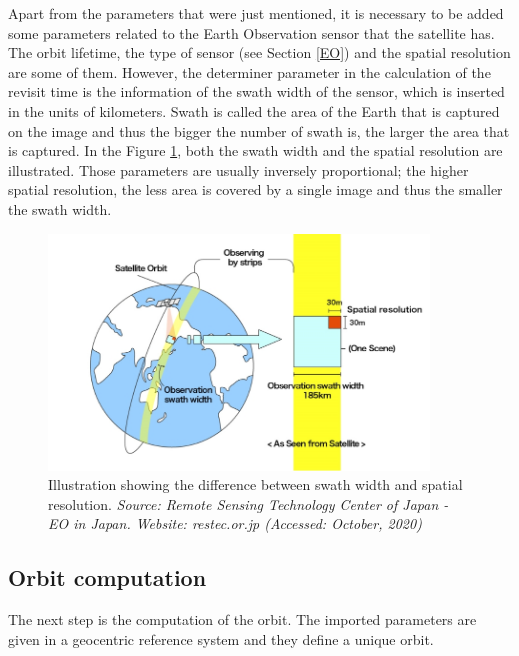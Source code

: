 Apart from the parameters that were just mentioned, it is necessary to be added some parameters related to the Earth Observation sensor that the satellite has. The orbit lifetime, the type of sensor (see Section \ref{EO}) and the spatial resolution are some of them. However, the determiner parameter in the calculation of the revisit time is the information of the swath width of the sensor, which is inserted in the units of kilometers. Swath is called the area of the Earth that is captured on the image and thus the bigger the number of swath is, the larger the area that is captured. In the Figure \ref{swath_width}, both the swath width and the spatial resolution are illustrated. Those parameters are usually inversely proportional; the higher spatial resolution, the less area is covered by a single image and thus the smaller the swath width.

\begin{figure}
\centering
\includegraphics[width=0.9\textwidth]{Images/swath_width.png}\caption{Illustration showing the difference between swath width and spatial resolution. \textit{Source: Remote Sensing Technology Center of Japan - EO in Japan. Website: restec.or.jp (Accessed: October, 2020)}} %
\label{swath_width} 
\end{figure}

\bigskip
\subsection{Orbit computation}
\bigskip

The next step is the computation of the orbit. The imported parameters are given in a geocentric reference system and they define a unique orbit.

